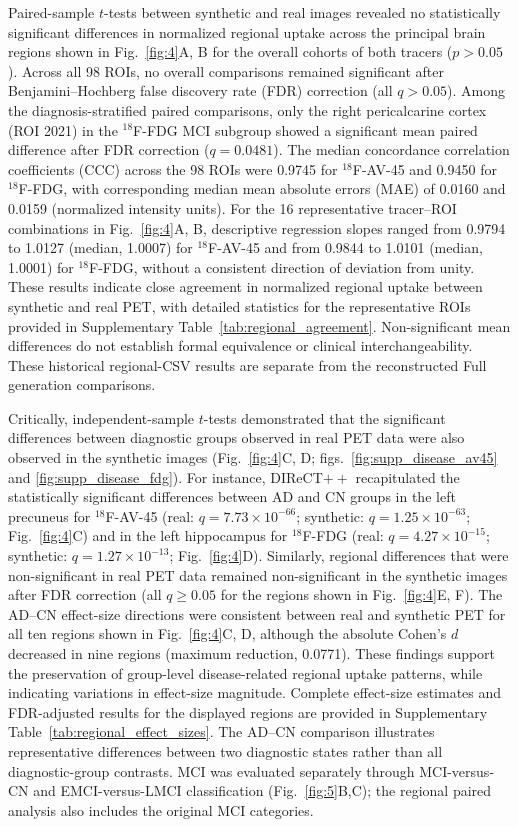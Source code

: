 \documentclass{article}
\begin{document}
Paired-sample $t$-tests between synthetic and real images revealed no statistically significant differences in normalized regional uptake across the principal brain regions shown in Fig.~\ref{fig:4}A, B for the overall cohorts of both tracers ($p>0.05$). Across all 98 ROIs, no overall comparisons remained significant after Benjamini--Hochberg false discovery rate (FDR) correction (all $q>0.05$). Among the diagnosis-stratified paired comparisons, only the right pericalcarine cortex (ROI 2021) in the $^{18}$F-FDG MCI subgroup showed a significant mean paired difference after FDR correction ($q=0.0481$). The median concordance correlation coefficients (CCC) across the 98 ROIs were 0.9745 for $^{18}$F-AV-45 and 0.9450 for $^{18}$F-FDG, with corresponding median mean absolute errors (MAE) of 0.0160 and 0.0159 (normalized intensity units). For the 16 representative tracer--ROI combinations in Fig.~\ref{fig:4}A, B, descriptive regression slopes ranged from 0.9794 to 1.0127 (median, 1.0007) for $^{18}$F-AV-45 and from 0.9844 to 1.0101 (median, 1.0001) for $^{18}$F-FDG, without a consistent direction of deviation from unity. These results indicate close agreement in normalized regional uptake between synthetic and real PET, with detailed statistics for the representative ROIs provided in Supplementary Table~\ref{tab:regional_agreement}. Non-significant mean differences do not establish formal equivalence or clinical interchangeability. These historical regional-CSV results are separate from the reconstructed Full generation comparisons.

Critically, independent-sample $t$-tests demonstrated that the significant differences between diagnostic groups observed in real PET data were also observed in the synthetic images (Fig.~\ref{fig:4}C, D; figs.~\ref{fig:supp_disease_av45} and \ref{fig:supp_disease_fdg}). For instance, DIReCT$++$ recapitulated the statistically significant differences between AD and CN groups in the left precuneus for $^{18}$F-AV-45 (real: $q=7.73\times10^{-66}$; synthetic: $q=1.25\times10^{-63}$; Fig.~\ref{fig:4}C) and in the left hippocampus for $^{18}$F-FDG (real: $q=4.27\times10^{-15}$; synthetic: $q=1.27\times10^{-13}$; Fig.~\ref{fig:4}D). Similarly, regional differences that were non-significant in real PET data remained non-significant in the synthetic images after FDR correction (all $q\geq0.05$ for the regions shown in Fig.~\ref{fig:4}E, F). The AD--CN effect-size directions were consistent between real and synthetic PET for all ten regions shown in Fig.~\ref{fig:4}C, D, although the absolute Cohen's $d$ decreased in nine regions (maximum reduction, 0.0771). These findings support the preservation of group-level disease-related regional uptake patterns, while indicating variations in effect-size magnitude. Complete effect-size estimates and FDR-adjusted results for the displayed regions are provided in Supplementary Table~\ref{tab:regional_effect_sizes}. The AD--CN comparison illustrates representative differences between two diagnostic states rather than all diagnostic-group contrasts. MCI was evaluated separately through MCI-versus-CN and EMCI-versus-LMCI classification (Fig.~\ref{fig:5}B,C); the regional paired analysis also includes the original MCI categories.
\end{document}
